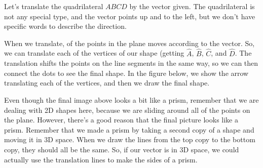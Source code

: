 \documentclass{ximera}
\begin{document}
\begin{example}
Let's translate the quadrilateral $ABCD$ by the vector given. The quadrilateral is not any special type, and the vector points up and to the left, but we don't have specific words to describe the direction.
\begin{center}
\end{center}
When we translate,  of the points in the plane moves according to the vector. So, we can translate each of the vertices of our shape (getting $\hat{A}$, $\hat{B}$, $\hat{C}$, and $\hat{D}$. The translation shifts the points on the line segments in the same way, so we can then connect the dots to see the final shape. In the figure below, we show the arrow translating each of the vertices, and then we draw the final shape.
\begin{center}
\end{center}

\end{example}
Even though the final image above looks a bit like a prism, remember that we are dealing with 2D shapes here, because we are sliding around all of the points on the plane. However, there's a good reason that the final picture looks like a prism. Remember that we made a prism by taking a second copy of a shape and moving it in 3D space. When we draw the lines from the top copy to the bottom copy, they should all be the same. So, if our vector is in 3D space, we could actually use the translation lines to make the sides of a prism.
\end{document}
